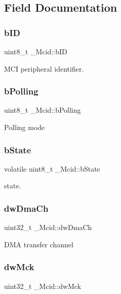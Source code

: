 \subsection{Field Documentation}
\mbox{\label{struct__Mcid_a617e9a8764aed056707b1fb337c850c5}} 
\subsubsection{\texorpdfstring{bID}{bID}}
{\footnotesize\ttfamily uint8\+\_\+t \+\_\+\+Mcid\+::b\+ID}

M\+CI peripheral identifier. \mbox{\label{struct__Mcid_aff7238b53d1765448bae3cd1f64c8b59}} 
\subsubsection{\texorpdfstring{bPolling}{bPolling}}
{\footnotesize\ttfamily uint8\+\_\+t \+\_\+\+Mcid\+::b\+Polling}

Polling mode \mbox{\label{struct__Mcid_af5a5b11262bc8b20ba78f882a207bf1c}} 
\subsubsection{\texorpdfstring{bState}{bState}}
{\footnotesize\ttfamily volatile uint8\+\_\+t \+\_\+\+Mcid\+::b\+State}

state. \mbox{\label{struct__Mcid_a0b402f365543d3f9a96bf522de7ce573}} 
\subsubsection{\texorpdfstring{dwDmaCh}{dwDmaCh}}
{\footnotesize\ttfamily uint32\+\_\+t \+\_\+\+Mcid\+::dw\+Dma\+Ch}

D\+MA transfer channel \mbox{\label{struct__Mcid_acaa674a44196de9ffd9a3206b21ac43d}} 
\subsubsection{\texorpdfstring{dwMck}{dwMck}}
{\footnotesize\ttfamily uint32\+\_\+t \+\_\+\+Mcid\+::dw\+Mck}

